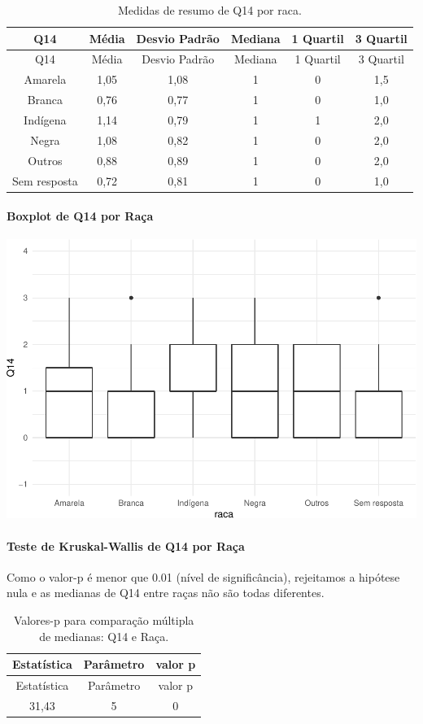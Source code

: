\documentclass[]{article}
\let\oldparagraph\paragraph
\renewcommand{\paragraph}[1]{\oldparagraph{#1}\mbox{}}
\begin{document}
\begin{longtable}[]{@{}cccccc@{}}
\caption{\label{tab:unnamed-chunk-46}Medidas de resumo de Q14 por raca.}\tabularnewline
\toprule
Q14 & Média & Desvio Padrão & Mediana & 1 Quartil & 3 Quartil\tabularnewline
\midrule
\endfirsthead
\toprule
Q14 & Média & Desvio Padrão & Mediana & 1 Quartil & 3 Quartil\tabularnewline
\midrule
\endhead
Amarela & 1,05 & 1,08 & 1 & 0 & 1,5\tabularnewline
Branca & 0,76 & 0,77 & 1 & 0 & 1,0\tabularnewline
Indígena & 1,14 & 0,79 & 1 & 1 & 2,0\tabularnewline
Negra & 1,08 & 0,82 & 1 & 0 & 2,0\tabularnewline
Outros & 0,88 & 0,89 & 1 & 0 & 2,0\tabularnewline
Sem resposta & 0,72 & 0,81 & 1 & 0 & 1,0\tabularnewline
\bottomrule
\end{longtable}

\hypertarget{boxplot-de-q14-por-rauxe7a}{%
\paragraph{Boxplot de Q14 por Raça}\label{boxplot-de-q14-por-rauxe7a}}

\begin{center}\includegraphics[width=0.75\linewidth]{relatorio_covid19_files/figure-latex/unnamed-chunk-47-1} \end{center}

\hypertarget{teste-de-kruskal-wallis-de-q14-por-rauxe7a}{%
\paragraph{Teste de Kruskal-Wallis de Q14 por Raça}\label{teste-de-kruskal-wallis-de-q14-por-rauxe7a}}

Como o valor-p é menor que 0.01 (nível de significância), rejeitamos a hipótese nula e as medianas de Q14 entre raças não são todas diferentes.

\begin{longtable}[]{@{}ccc@{}}
\caption{\label{tab:unnamed-chunk-49}Valores-p para comparação múltipla de medianas: Q14 e Raça.}\tabularnewline
\toprule
Estatística & Parâmetro & valor p\tabularnewline
\midrule
\endfirsthead
\toprule
Estatística & Parâmetro & valor p\tabularnewline
\midrule
\endhead
31,43 & 5 & 0\tabularnewline
\bottomrule
\end{longtable}
\end{document}
